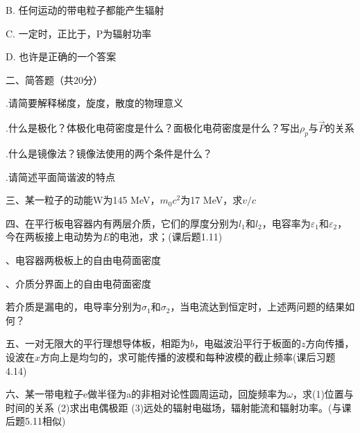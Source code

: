 B.\hspace{0.8em}
任何运动的带电粒子都能产生辐射
\vspace{0.2cm}

C.\hspace{0.8em}
一定时，正比于，P为辐射功率
\vspace{0.2cm}

D.\hspace{0.8em}
也许是正确的一个答案

\newpage

\noindent
二、简答题（共20分）
\vspace{0.2cm}

.\hspace{0.8em}请简要解释梯度，旋度，散度的物理意义
\vspace{0.5cm}

.\hspace{0.8em}什么是极化？体极化电荷密度是什么？面极化电荷密度是什么？写出$\rho_p$与$\Vec{P}$的关系

\vspace{0.5cm}

.\hspace{0.8em}什么是镜像法？镜像法使用的两个条件是什么？
\vspace{0.5cm}

.\hspace{0.8em}请简述平面简谐波的特点
\vspace{1cm}



\noindent
三、\hspace{0.2em}某一粒子的动能W为145 MeV，$m_0c^2$为17 MeV，求$v/c$
\vspace{3cm}

\noindent
四、\hspace{0.2em}在平行板电容器内有两层介质，它们的厚度分别为$l_1$和$l_2$，电容率为$\varepsilon_1$和$\varepsilon_2$，今在两板接上电动势为$E$的电池，求；(课后题1.11)
\vspace{0.2cm}

、电容器两极板上的自由电荷面密度
\vspace{0.1cm}

、介质分界面上的自由电荷面密度\vspace{0.1cm}

\noindent
若介质是漏电的，电导率分别为$\sigma_1$和$\sigma_2$，当电流达到恒定时，上述两问题的结果如何？
\vspace{4cm}


\noindent
五、\hspace{0.2em}一对无限大的平行理想导体板，相距为$b$，电磁波沿平行于板面的$z$方向传播，设波在$x$方向上是均匀的，求可能传播的波模和每种波模的截止频率(课后习题4.14)
\vspace{4cm}

\noindent
六、\hspace{0.2em}某一带电粒子e做半径为a的非相对论性圆周运动，回旋频率为$\omega$，求(1)位置与时间的关系 (2)求出电偶极距 (3)远处的辐射电磁场，辐射能流和辐射功率。(与课后题5.11相似)